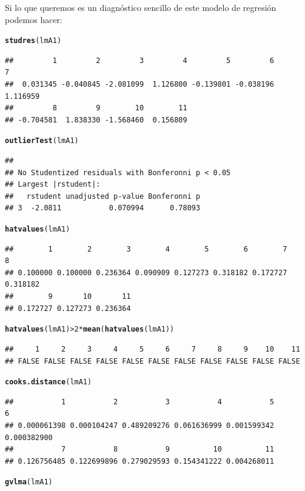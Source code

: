 \documentclass[10pt,a4paper]{article}\usepackage[]{graphicx}\usepackage[]{color}
\makeatletter
\newcommand{\hlnum}[1]{\textcolor[rgb]{0.686,0.059,0.569}{#1}}%
\newcommand{\hlopt}[1]{\textcolor[rgb]{0,0,0}{#1}}%
\newcommand{\hlstd}[1]{\textcolor[rgb]{0.345,0.345,0.345}{#1}}%
\newcommand{\hlkwd}[1]{\textcolor[rgb]{0.737,0.353,0.396}{\textbf{#1}}}%
\newenvironment{kframe}{%
 \def\at@end@of@kframe{}%
 \ifinner\ifhmode%
  \def\at@end@of@kframe{\end{minipage}}%
  \begin{minipage}{\columnwidth}%
 \fi\fi%
 \def\FrameCommand##1{\hskip\@totalleftmargin \hskip-\fboxsep
 \colorbox{shadecolor}{##1}\hskip-\fboxsep
     \hskip-\linewidth \hskip-\@totalleftmargin \hskip\columnwidth}%
 \MakeFramed {\advance\hsize-\width
   \@totalleftmargin\z@ \linewidth\hsize
   \@setminipage}}%
 {\par\unskip\endMakeFramed%
 \at@end@of@kframe}
\newenvironment{knitrout}{}{} %
\newcounter {cont01}
\makeatother
\begin{document}
Si lo que queremos es un diagnóstico sencillo de este modelo de regresión podemos hacer:
\begin{knitrout}
\color{fgcolor}\begin{kframe}
\begin{alltt}
\hlkwd{studres}\hlstd{(lmA1)}
\end{alltt}
\begin{verbatim}
##         1         2         3         4         5         6         7 
##  0.031345 -0.040845 -2.081099  1.126800 -0.139801 -0.038196  1.116959 
##         8         9        10        11 
## -0.704581  1.838330 -1.568460  0.156809
\end{verbatim}
\begin{alltt}
\hlkwd{outlierTest}\hlstd{(lmA1)}
\end{alltt}
\begin{verbatim}
## 
## No Studentized residuals with Bonferonni p < 0.05
## Largest |rstudent|:
##   rstudent unadjusted p-value Bonferonni p
## 3  -2.0811           0.070994      0.78093
\end{verbatim}
\begin{alltt}
\hlkwd{hatvalues}\hlstd{(lmA1)}
\end{alltt}
\begin{verbatim}
##        1        2        3        4        5        6        7        8 
## 0.100000 0.100000 0.236364 0.090909 0.127273 0.318182 0.172727 0.318182 
##        9       10       11 
## 0.172727 0.127273 0.236364
\end{verbatim}
\begin{alltt}
\hlkwd{hatvalues}\hlstd{(lmA1)} \hlopt{>} \hlnum{2} \hlopt{*} \hlkwd{mean}\hlstd{(}\hlkwd{hatvalues}\hlstd{(lmA1))}
\end{alltt}
\begin{verbatim}
##     1     2     3     4     5     6     7     8     9    10    11 
## FALSE FALSE FALSE FALSE FALSE FALSE FALSE FALSE FALSE FALSE FALSE
\end{verbatim}
\begin{alltt}
\hlkwd{cooks.distance}\hlstd{(lmA1)}
\end{alltt}
\begin{verbatim}
##           1           2           3           4           5           6 
## 0.000061398 0.000104247 0.489209276 0.061636999 0.001599342 0.000382900 
##           7           8           9          10          11 
## 0.126756485 0.122699896 0.279029593 0.154341222 0.004268011
\end{verbatim}
\begin{alltt}
\hlkwd{gvlma}\hlstd{(lmA1)}
\end{alltt}


{\ttfamily\noindent\bfseries{}}\end{kframe}
\end{knitrout}
\end{document}
